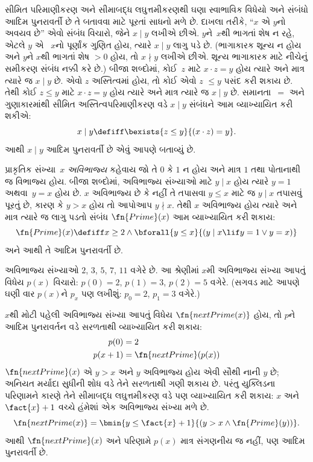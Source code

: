 સીમિત પરિમાણીકરણ અને સીમાબદ્ધ લઘુત્તમીકરણથી ઘણા સ્વાભાવિક વિધેયો
અને સંબંધો આદિમ પુનરાવર્તી છે તે બતાવવા માટે પૂરતાં સાધનો મળે છે.
દાખલા તરીકે, ``$x$ એ $y$નો અવયવ છે'' એવો સંબંધ વિચારો, જેને
$x \mid y$ લખીએ છીએ. $y$ને~$x$થી ભાગતાં શેષ ન રહે, એટલે $y$ એ
~$x$નો પૂર્ણાંક ગુણિત હોય, ત્યારે $x \mid y$ લાગુ પડે છે. (ભાગાકારક
શૂન્ય ન હોય અને $y$ને $x$થી ભાગતાં શેષ $> 0$ હોય, તો $x \nmid y$
લખીએ છીએ. શૂન્ય ભાગાકારક માટે નીચેનું સમીકરણ સંબંધ નક્કી કરે છે.)
બીજા શબ્દોમાં, કોઈ~$z$ માટે $x \cdot z = y$ હોય
ત્યારે અને માત્ર ત્યારે જ $x \mid y$ છે. એવો $z$ અસ્તિત્વમાં
હોય, તો કોઈ એવો $z$ $\leq y$ પસંદ કરી શકાય છે. તેથી કોઈ
$z \le y$ માટે $x \cdot z = y$ હોય ત્યારે અને માત્ર ત્યારે જ
$x \mid y$ છે. સમાનતા~$=$ અને ગુણાકારમાંથી સીમિત
અસ્તિત્વપરિમાણીકરણ વડે $x \mid y$ સંબંધને આમ વ્યાખ્યાયિત કરી
શકીએ:
\[
x \mid y \defiff \bexists{z \leq y}{(x \cdot z) = y}.
\]
આથી $x \mid y$ આદિમ પુનરાવર્તી છે એવું આપણે બતાવ્યું છે.


પ્રાકૃતિક સંખ્યા~$x$ \emph{અવિભાજ્ય} કહેવાય જો તે $0$ કે $1$
ન હોય અને માત્ર $1$ તથા પોતાનાથી જ વિભાજ્ય હોય. બીજા શબ્દોમાં,
અવિભાજ્ય સંખ્યાઓ માટે $y \mid x$ હોય ત્યારે $y = 1$ અથવા~$y=x$
હોય છે. $x$ અવિભાજ્ય છે કે નહીં તે તપાસવા $y \le x$ માટે જ
$y \mid x$ તપાસવું પૂરતું છે, કારણ કે $y > x$ હોય તો આપોઆપ
$y \nmid x$. તેથી $x$ અવિભાજ્ય હોય ત્યારે અને માત્ર ત્યારે જ
લાગુ પડતો સંબંધ $\fn{Prime}(x)$ આમ વ્યાખ્યાયિત કરી શકાય:
\[
\fn{Prime}(x) \defiff x \geq 2 \land \bforall{y \leq x}{(y \mid x \lif y
  = 1 \lor y = x)}
\]
અને આથી તે આદિમ પુનરાવર્તી છે.

અવિભાજ્ય સંખ્યાઓ $2$, $3$, $5$, $7$, $11$ વગેરે છે. આ શ્રેણીમાં
$x$મી અવિભાજ્ય સંખ્યા આપતું વિધેય $p(x)$ વિચારો: $p(0) =
2$, $p(1) = 3$, $p(2) = 5$ વગેરે. (સગવડ માટે આપણે ઘણી વાર
$p(x)$ને $p_x$ પણ લખીશું: $p_0=2$, $p_1=3$ વગેરે.)

$x$થી મોટી પહેલી અવિભાજ્ય સંખ્યા આપતું વિધેય
$\fn{nextPrime(x)}$ હોય, તો $p$ને આદિમ પુનરાવર્તન વડે સરળતાથી
વ્યાખ્યાયિત કરી શકાય:
\begin{align*}
  p(0) & = 2\\
  p(x+1) & = \fn{nextPrime}(p(x))
\end{align*}
$\fn{nextPrime}(x)$ એ $y > x$ અને $y$ અવિભાજ્ય હોય એવી સૌથી
નાની $y$ છે; અનિયત મર્યાદા સુધીની શોધ વડે તેને સરળતાથી ગણી
શકાય છે. પરંતુ યુક્લિડના પરિણામને કારણે તેને સીમાબદ્ધ
લઘુત્તમીકરણ વડે પણ વ્યાખ્યાયિત કરી શકાય: $x$ અને $\fact{x}+1$
વચ્ચે હંમેશાં એક અવિભાજ્ય સંખ્યા મળે છે.
\[
  \fn{nextPrime(x)} =
  \bmin{y \leq \fact{x}+1}{(y > x \land \fn{Prime}(y))}.
\]
આથી $\fn{nextPrime}(x)$ અને પરિણામે $p(x)$ માત્ર સંગણનીય જ નહીં,
પણ આદિમ પુનરાવર્તી છે.

